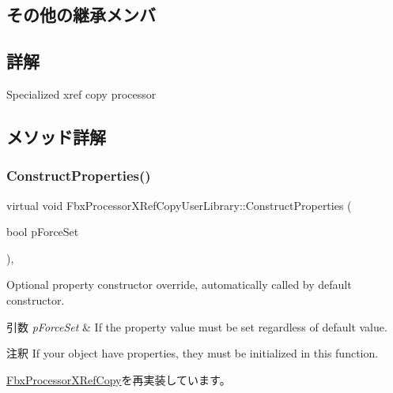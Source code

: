 \subsection*{その他の継承メンバ}


\subsection{詳解}
Specialized xref copy processor 

\subsection{メソッド詳解}
\mbox{\label{class_fbx_processor_x_ref_copy_user_library_a52eeb515bf8df31ec5d098697fe494b3}} 
\subsubsection{\texorpdfstring{Construct\+Properties()}{ConstructProperties()}}
{\footnotesize\ttfamily virtual void Fbx\+Processor\+X\+Ref\+Copy\+User\+Library\+::\+Construct\+Properties (\begin{DoxyParamCaption}\item[{bool}]{p\+Force\+Set }\end{DoxyParamCaption})\hspace{0.3cm}{\ttfamily [protected]}, {\ttfamily [virtual]}}

Optional property constructor override, automatically called by default constructor. 
\begin{DoxyParams}{引数}
{\em p\+Force\+Set} & If the property value must be set regardless of default value. \\
\hline
\end{DoxyParams}
\begin{DoxyRemark}{注釈}
If your object have properties, they must be initialized in this function. 
\end{DoxyRemark}


\hyperlink{class_fbx_processor_x_ref_copy_afccc4a20df6bee60d5ce2a7a9ca11666}{Fbx\+Processor\+X\+Ref\+Copy}を再実装しています。

\mbox{\label{class_fbx_processor_x_ref_copy_user_library_a65545232dad661700a6c43e90530b3a6}} 
